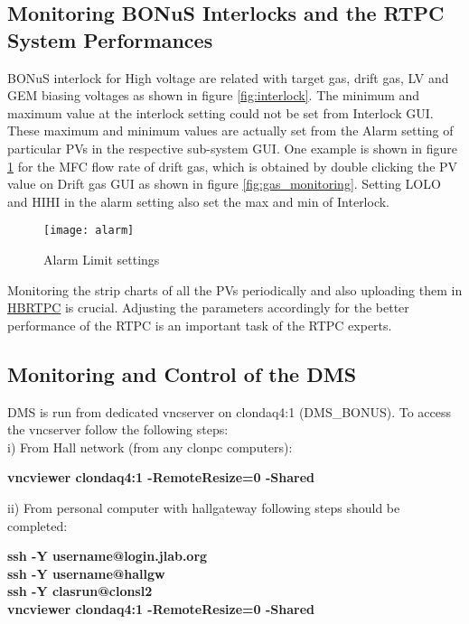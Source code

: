 \subsection{Monitoring BONuS Interlocks and the RTPC System Performances}
\label{sub-sec:PerfomanceMonitor}

BONuS interlock for High voltage are related with target gas, drift gas, LV and GEM biasing voltages as shown in figure \ref{fig:interlock}. The minimum and maximum value at the interlock setting could not be set from Interlock GUI. These maximum and minimum values are actually set from the Alarm setting of particular PVs in the respective sub-system GUI. One example is shown in figure \ref{fig:alarm_limit} for the MFC flow rate of drift gas, which is obtained by double clicking the PV value on Drift gas GUI as shown in figure \ref{fig:gas_monitoring}. Setting LOLO and HIHI in the alarm setting also set the max and min of Interlock.

\begin{figure}[H]
	\centering
	\texttt{[image: alarm]}
	\caption{Alarm Limit settings}
	\label{fig:alarm_limit}
\end{figure}

Monitoring the strip charts of all the PVs periodically and also uploading them in \href{https://logbooks.jlab.org/book/hbrtpc}{HBRTPC} is crucial. Adjusting the parameters accordingly for the better performance of the RTPC is an important task of the RTPC experts.

\subsection{Monitoring and Control of the DMS}
\label{sub-sec:DMS}

DMS is run from dedicated vncserver on clondaq4:1 (DMS\_BONUS). To access the vncserver follow the following steps:\\

i) From Hall network (from any clonpc computers):
\begin{center}
	\centering \textbf{vncviewer clondaq4:1 -RemoteResize=0 -Shared}
\end{center}

ii) From personal computer with hallgateway following steps should be completed:

\begin{center}
	\centering \textbf{ssh -Y username@login.jlab.org}\\
	\centering \textbf{ssh -Y username@hallgw}\\
	\centering \textbf{ssh -Y clasrun@clonsl2}\\
	\centering \textbf{vncviewer clondaq4:1 -RemoteResize=0 -Shared}
\end{center} 

